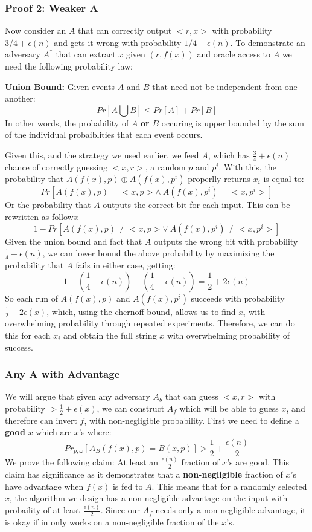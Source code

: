 \documentclass[11pt]{article}
\begin{document}
\subsubsection{Proof 2: Weaker A}
Now consider an $A$ that can correctly output $<r,x>$ with probability $3/4 + \epsilon(n)$ and gets it wrong with probability $1/4 - \epsilon(n)$. To demonstrate an adversary $A^*$ that can extract $x$ given $(r,f(x))$ and oracle access to $A$ we need the following probability law:
\vspace{1em}

\textbf{Union Bound:} Given events $A$ and $B$ that need not be independent from one another:
$$Pr[A \bigcup B] \leq Pr[A] + Pr[B]$$
In other words, the probability of $A$ \textbf{or} $B$ occuring is upper bounded by the sum of the individual probaiblities that each event occurs.
\vspace{1em}

Given this, and the strategy we used earlier, we feed $A$, which has $\frac{3}{4} + \epsilon(n)$ chance of correctly guessing $<x,r>$, a random $p$ and $p^i$. With this, the probability that $A(f(x),p) \oplus A(f(x),p^i)$ properlly returns $x_i$ is equal to:
$$Pr[A(f(x),p) = <x,p> \land \ A(f(x),p^i) = <x,p^i>]$$
Or the probability that $A$ outputs the correct bit for each input. This can be rewritten as follows:
$$1 - Pr[A(f(x),p) \neq <x, p> \lor \ A(f(x),p^i) \neq <x,p^i>]$$
Given the union bound and fact that $A$ outputs the wrong bit with probability $\frac{1}{4}-\epsilon(n)$, we can lower bound the above probability by maximizing the probability that $A$ fails in either case, getting:
$$1-(\frac{1}{4}-\epsilon(n))-(\frac{1}{4}-\epsilon(n)) = \frac{1}{2}+2\epsilon(n)$$
So each run of $A(f(x),p)$ and $A(f(x),p^i)$ succeeds with probability $\frac{1}{2} + 2\epsilon(x)$, which, using the chernoff bound, allows us to find $x_i$ with overwhelming probability through repeated experiments. Therefore, we can do this for each $x_i$ and obtain the full string $x$ with overwhelming probability of success.
\subsubsection{Any A with Advantage}
We will argue that given any adversary $A_b$ that can guess $<x,r>$ with probability $> \frac{1}{2} + \epsilon(x)$, we can construct $A_f$ which will be able to guess $x$, and therefore can invert $f$, with non-negligible probability. First we need to define a \textbf{good} $x$ which are $x$'s where:
$$Pr_{p,\omega}[A_B(f(x),p) = B(x,p)] > \frac{1}{2} + \frac{\epsilon(n)}{2}$$
We prove the following claim: At least an $\frac{\epsilon(n)}{2}$ fraction of $x$'s are good. This claim has significance as it demonstrates that a \textbf{non-negligible} fraction of $x$'s have advantage when $f(x)$ is fed to $A$. This means that for a randomly selected $x$, the algorithm we design has a non-negligible advantage on the input with probaility of at least $\frac{\epsilon(n)}{2}$. Since our $A_f$ needs only a non-negligible advantage, it is okay if in only works on a non-negligible fraction of the $x$'s.
\vspace{1em}
\end{document}
